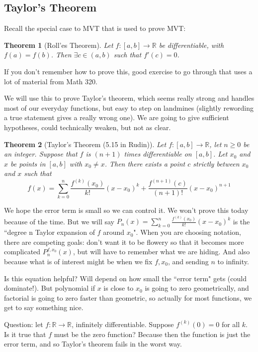 \documentclass{article}
\theoremstyle{plain}
\newtheorem{theorem}{Theorem}
\theoremstyle{remark}
\newcommand{\R}{{\mathbb R}}
\begin{document}
\subsection{Taylor's Theorem}
Recall the special case to MVT that is used to prove MVT:
\begin{theorem}[Roll'es Theorem]
	Let $f \colon [a,b] \to \R$ be differentiable, with $f(a) = f(b)$.
	Then $\exists c \in (a,b)$ such that $f'(c) = 0$.
\end{theorem}
If you don't remember how to prove this, good exercise to go through
that uses a lot of material from Math 320.

We will use this to prove Taylor's theorem,
which seems really strong and handles most of our everyday functions,
but easy to step on landmines
(slightly rewording a true statement gives a really wrong one).
We are going to give sufficient hypotheses, could technically weaken, but not as clear.
\begin{theorem}[Taylor's Theorem (5.15 in Rudin)]
	Let $f \colon [a,b] \to \R$, let $n \geq 0$ be an integer.
	Suppose that $f$ is $(n+1)$ times differentiable on $[a,b]$.
	Let $x_0$ and $x$ be points in $[a,b]$ with $x_0 \neq x$.
	Then there exists a point $c$ strictly between $x_0$ and $x$ such that
	\begin{equation}\label{Taylor}
		f(x) = \sum_{k = 0}^n \frac{f^{(k)}(x_0)}{k!}(x-x_0)^k
		+ \frac{f^{(n+1)}(c)}{(n+1)!}(x-x_0)^{n+1}
	\end{equation}
\end{theorem}
We hope the error term is small so we can control it.
We won't prove this today because of the time.
But we will say $P_n(x) = \sum_{k = 0}^n \frac{f^{(k)}(x_0)}{k!}(x-x_0)^k$
is the ``degree n Taylor expansion of $f$ around $x_0$".
When you are choosing notation, there are competing goals:
don't want it to be flowery so that it becomes more complicated $P_n^{f,x_0}(x)$,
but will have to remember what we are hiding.
And also because what is of interest might be when we fix $f,x_0$,
and sending $n$ to infinity.

Is this equation helpful? Will depend on how small the ``error term" gets (could dominate!).
But polynomial if $x$ is close to $x_0$ is going to zero geometrically,
and factorial is going to zero faster than geometric,
so actually for most functions, we get to say something nice.

Question: let $f \colon \R \to \R$, infinitely differentiable.
Suppose $f^{(k)}(0) = 0$ for all $k$.
Is it true that $f$ must be the zero function?
Because then the function is just the error term, and so Taylor's theorem fails in the worst way.
\end{document}
